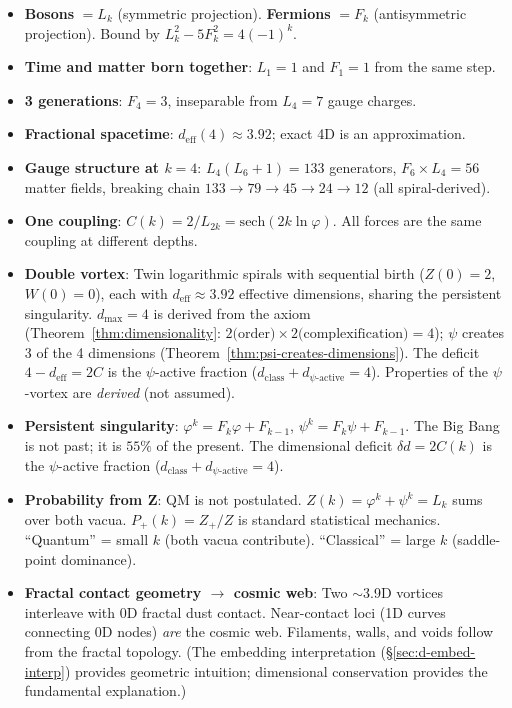 \documentclass[12pt,a4paper]{article}
\begin{document}
\begin{itemize}
\item \textbf{Bosons} $= L_k$ (symmetric projection). \textbf{Fermions} $= F_k$ (antisymmetric projection). Bound by $L_k^2 - 5F_k^2 = 4(-1)^k$.
\item \textbf{Time and matter born together}: $L_1 = 1$ and $F_1 = 1$ from the same step.
\item \textbf{3 generations}: $F_4 = 3$, inseparable from $L_4 = 7$ gauge charges.
\item \textbf{Fractional spacetime}: $d_{\mathrm{eff}}(4) \approx 3.92$; exact 4D is an approximation.
\item \textbf{Gauge structure at $k = 4$}: $L_4(L_6{+}1) = 133$ generators, $F_6 \times L_4 = 56$ matter fields, breaking chain $133 \to 79 \to 45 \to 24 \to 12$ (all spiral-derived).
\item \textbf{One coupling}: $C(k) = 2/L_{2k} = \mathrm{sech}(2k\ln\varphi)$. All forces are the same coupling at different depths.
\item \textbf{Double vortex}: Twin logarithmic spirals with sequential birth ($Z(0)=2$, $W(0)=0$), each with $d_{\mathrm{eff}} \approx 3.92$ effective dimensions, sharing the persistent singularity. $d_{\max} = 4$ is derived from the axiom (Theorem~\ref{thm:dimensionality}: $2\text{(order)} \times 2\text{(complexification)} = 4$); $\psi$ creates 3 of the 4 dimensions (Theorem~\ref{thm:psi-creates-dimensions}). The deficit $4 - d_{\mathrm{eff}} = 2C$ is the $\psi$-active fraction ($d_{\mathrm{class}} + d_{\psi\text{-active}} = 4$). Properties of the $\psi$-vortex are \emph{derived} (not assumed).
\item \textbf{Persistent singularity}: $\varphi^k = F_k\varphi + F_{k-1}$, $\psi^k = F_k\psi + F_{k-1}$. The Big Bang is not past; it is $55\%$ of the present. The dimensional deficit $\delta d = 2C(k)$ is the $\psi$-active fraction ($d_{\mathrm{class}} + d_{\psi\text{-active}} = 4$).
\item \textbf{Probability from Z}: QM is not postulated. $Z(k) = \varphi^k + \psi^k = L_k$ sums over both vacua. $P_+(k) = Z_+/Z$ is standard statistical mechanics. ``Quantum'' = small $k$ (both vacua contribute). ``Classical'' = large $k$ (saddle-point dominance).
\item \textbf{Fractal contact geometry $\to$ cosmic web}: Two $\sim$3.9D vortices interleave with 0D fractal dust contact. Near-contact loci (1D curves connecting 0D nodes) \emph{are} the cosmic web. Filaments, walls, and voids follow from the fractal topology. (The embedding interpretation (\S\ref{sec:d-embed-interp}) provides geometric intuition; dimensional conservation provides the fundamental explanation.)

\end{itemize}
\end{document}
